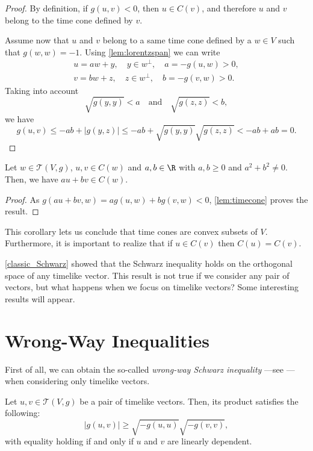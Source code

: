 \begin{proof}
    By definition, if $g(u,v)<0$, then $u\in C(v)$, and therefore $u$ and $v$ belong to the time cone defined by $v$.
    
    Assume now that $u$ and $v$ belong to a same time cone defined by a $w \in V$ such that $g(w,w) = -1$. Using \autoref{lem:lorentzspan} we can write
    \begin{align*}
        u=aw+y, \quad y\in w^{\perp}, \quad a=-g(u,w)>0,\\
        v=bw+z, \quad z\in w^{\perp}, \quad b=-g(v,w)>0.
    \end{align*}
    Taking into account
    \[
	    \sqrt{g(y,y)}<a \quad \mathrm{and} \quad \sqrt{g(z,z)}<b,
    \]
    we have
    \[
	    g(u,v)\leq -ab+ \lvert g(y,z) \rvert \leq -ab + \sqrt{g(y,y)}\sqrt{g(z,z)}<-ab+ab=0.
    \]
\end{proof}

\begin{corollary}\label{convexity}
Let $w\in\mathcal{T}(V,g)$, $u,v\in C(w)$ and $a,b\in \R$ with $a,b\geq 0$ and $a^2+b^2 \neq 0$. Then, we have $au+bv\in C(w)$.
\end{corollary}

\begin{proof}
    As $g(au+bv,w)=a g(u,w)+ b g(v,w)<0$, \autoref{lem:timecone} proves the result.
\end{proof}

This corollary lets us conclude that time cones are convex subsets of $V$. Furthermore, it is important to realize that if $u\in C(v)$ then $C(u)=C(v)$.

\autoref{classic_Schwarz} showed that the Schwarz inequality holds on the orthogonal space of any timelike vector. This result is not true if we consider any pair of vectors, but what happens when we focus on timelike vectors? Some interesting results will appear.

\section{Wrong-Way Inequalities}

First of all, we can obtain the so-called \emph{wrong-way Schwarz inequality} ---see \cite[Prop. 5.30]{oneill83}--- when considering only timelike vectors.

\begin{proposition}
	\label{pro:wrongway}
    Let $u,v \in \mathcal{T}(V,g)$ be a pair of timelike vectors. Then, its product satisfies the following:
    \[
        \lvert g(u,v) \vert \geq \sqrt{-g(u,u)}\sqrt{-g(v,v)},
    \]
    with equality holding if and only if $u$ and $v$ are linearly dependent.
\end{proposition}

